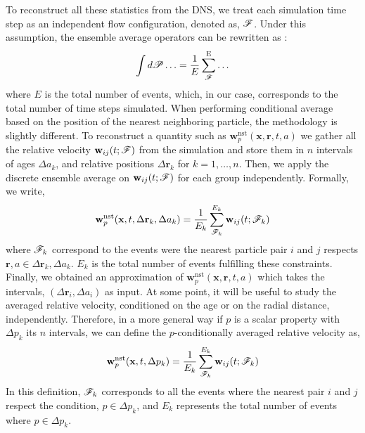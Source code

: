 To reconstruct all these statistics from the DNS, we treat each simulation time step  as an independent flow configuration, denoted as, $\mathscr{F}$. 
Under this assumption, the ensemble average operators can be rewritten as :
\begin{equation}
    \int  d\mathscr{P}\ldots
    = \frac{1}{E}\sum_{\mathscr{F}}^\text{E} \ldots 
    \label{eq:discrete_ensemble_average}
\end{equation}
where $E$ is the total number of events, which, in our case, corresponds to the total number of time steps simulated.  
When performing conditional average based on the position of the nearest neighboring particle, the methodology is slightly different. 
To reconstruct a quantity such as $\textbf{w}^\text{nst}_p(\textbf{x},\textbf{r},t,a)$ we gather all the relative velocity $\textbf{w}_{ij}(t;\mathscr{F})$ from the simulation and store them in $n$ intervals of ages $\Delta a_k$, and relative positions $\Delta \textbf{r}_k$ for $k = 1,\ldots, n$.
Then, we apply the discrete ensemble average on $\textbf{w}_{ij}(t;\mathscr{F})$ for each group independently.
Formally, we write, 
\begin{equation}
    \textbf{w}^\text{nst}_p(\textbf{x},t,\Delta\textbf{r}_k,\Delta a_k)
    = \frac{1}{E_k} 
    \sum^{E_k}_{\mathscr{F}_k} 
    \textbf{w}_{ij}(t;\mathscr{F}_k)
    \label{eq:vec_cond}
\end{equation}
where $\mathscr{F}_k$ correspond to the events were the nearest particle pair $i$ and $j$ respects $\textbf{r},a \in \Delta \textbf{r}_k ,\Delta a_k$.
$E_k$ is the total number of events fulfilling these constraints. 
Finally, we obtained an approximation of $\textbf{w}^\text{nst}_p(\textbf{x},\textbf{r},t,a)$ which takes the intervals, $(\Delta\textbf{r}_i,\Delta a_i)$ as input.
At some point, it will be useful to study the averaged relative velocity, conditioned on the age or on the radial distance, independently. 
Therefore, in a more general way if $p$ is a scalar property with $\Delta p_k$ its $n$ intervals, we can define the $p$-conditionally averaged relative velocity as, 
\begin{equation}
    \textbf{w}^\text{nst}_p(\textbf{x},t,\Delta p_k)
    = \frac{1}{E_{k}} 
    \sum^{E_{k}}_{\mathscr{F}_{k}}  
    \textbf{w}_{ij}(t;\mathscr{F}_k)
    \label{eq:scalar_cond}
\end{equation}
In this definition, $\mathscr{F}_{k}$ corresponds to all the events where the nearest pair $i$ and $j$ respect the condition, $p \in \Delta p_k$, and $E_{k}$ represents the total number of events where $p\in\Delta p_k$. 

